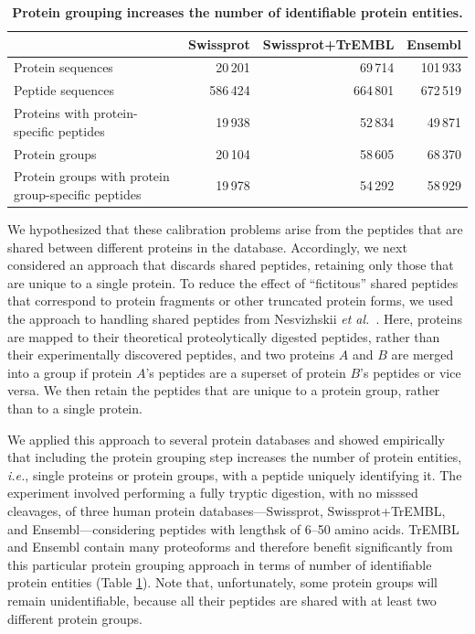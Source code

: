 \documentclass{article}
\begin{document}
\begin{table}
\caption{\label{tab:duplicate-proteins}\textbf{Protein grouping
    increases the number of identifiable protein entities.}}
\scriptsize
\begin{center}
\begin{tabular}{lrrr}
\hline
& Swissprot & Swissprot+TrEMBL & Ensembl\\
\hline
Protein sequences & 20\,201 & 69\,714 & 101\,933\\
Peptide sequences & 586\,424 & 664\,801 & 672\,519\\
Proteins with protein-specific peptides & 19\,938 & 52\,834 &
49\,871\\
Protein groups & 20\,104 & 58\,605 & 68\,370\\
Protein groups with protein group-specific peptides & 19\,978 &
54\,292 & 58\,929\\
\hline
\end{tabular}
\end{center}
\end{table}

We hypothesized that these calibration problems arise from the
peptides that are shared between different proteins in the database.
Accordingly, we next considered an approach that discards shared
peptides, retaining only those that are unique to a single protein.
To reduce the effect of ``fictitous'' shared peptides that correspond
to protein fragments or other truncated protein forms, we used the
approach to handling shared peptides from Nesvizhskii {\em et
  al.}~\cite{nesvizhskii2003statistical}. Here, proteins are mapped to
their theoretical proteolytically digested peptides, rather than their
experimentally discovered peptides, and two proteins $A$ and $B$ are
merged into a group if protein $A$'s peptides are a superset of
protein $B$'s peptides or vice versa.  We then retain the peptides
that are unique to a protein group, rather than to a single protein.

We applied this approach to several protein databases and showed
empirically that including the protein grouping step increases the
number of protein entities, {\em i.e.}, single proteins or protein
groups, with a peptide uniquely identifying it.  The experiment
involved performing a fully tryptic digestion, with no misssed
cleavages, of three human protein databases---Swissprot,
Swissprot+TrEMBL, and Ensembl---considering peptides with lengthsk of
6--50 amino acids. TrEMBL and Ensembl contain many proteoforms and
therefore benefit significantly from this particular protein grouping
approach in terms of number of identifiable protein entities (Table
\ref{tab:duplicate-proteins}). Note that, unfortunately, some protein
groups will remain unidentifiable, because all their peptides are
shared with at least two different protein groups.
\end{document}
